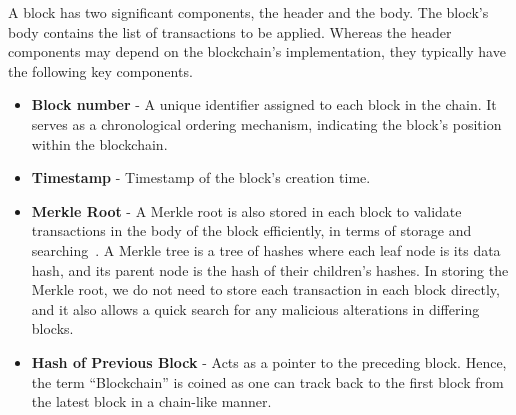 \noindent A block has two significant components, the header and the body. The block's body contains the list of transactions to be applied. Whereas the header components may depend on the blockchain's implementation, they typically have the following key components.
\begin{itemize}
    \item \textbf{Block number} - A unique identifier assigned to each block in the chain. It serves as a chronological ordering mechanism, indicating the block's position within the blockchain.
    \item \textbf{Timestamp} - Timestamp of the block's creation time.
    \item \textbf{Merkle Root} - A Merkle root is also stored in each block to validate transactions in the body of the block efficiently, in terms of storage and searching~\cite{noauthor_merkle_nodate}. A Merkle tree is a tree of hashes where each leaf node is its data hash, and its parent node is the hash of their children's hashes. In storing the Merkle root, we do not need to store each transaction in each block directly, and it also allows a quick search for any malicious alterations in differing blocks.
    \item \textbf{Hash of Previous Block} - Acts as a pointer to the preceding block. Hence, the term ``Blockchain'' is coined as one can track back to the first block from the latest block in a chain-like manner.
\end{itemize}

